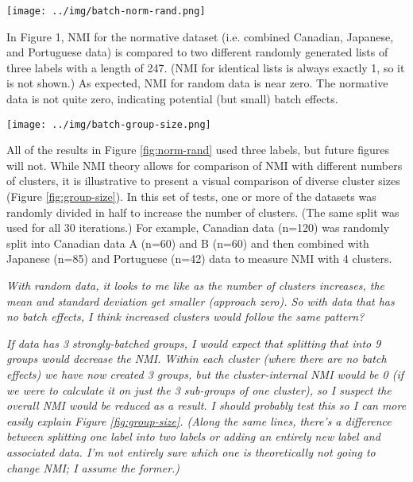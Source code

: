 \documentclass[12pt]{article}
\begin{document}
\begin{figure*}[ht]
  \centering
       \texttt{[image: ../img/batch-norm-rand.png]}
         \caption{}
  \label{fig:norm-rand}
\end{figure*}

In Figure 1, NMI for the normative dataset (i.e. combined Canadian, Japanese, and Portuguese data) is compared to two different randomly generated lists of three labels with a length of 247. (NMI for identical lists is always exactly 1, so it is not shown.) As expected, NMI for random data is near zero. The normative data is not quite zero, indicating potential (but small) batch effects.

\pagebreak

\begin{figure*}
  \centering
       \texttt{[image: ../img/batch-group-size.png]}
         \caption{}
  \label{fig:group-size}
\end{figure*}

All of the results in Figure \ref{fig:norm-rand} used three labels, but future figures will not. While NMI theory allows for comparison of NMI with different numbers of clusters, it is illustrative to present a visual comparison of diverse cluster sizes (Figure \ref{fig:group-size}). In this set of tests, one or more of the datasets was randomly divided in half to increase the number of clusters. (The same split was used for all 30 iterations.) For example, Canadian data (n=120) was randomly split into Canadian data A (n=60) and B (n=60) and then combined with Japanese (n=85) and Portuguese (n=42) data to measure NMI with 4 clusters.

\emph{With random data, it looks to me like as the number of clusters increases, the mean and standard deviation get smaller (approach zero). So with data that has no batch effects, I think increased clusters would follow the same pattern?}

\emph{If data has 3 strongly-batched groups, I would expect that splitting that into 9 groups would decrease the NMI. Within each cluster (where there are no batch effects) we have now created 3 groups, but the cluster-internal NMI would be 0 (if we were to calculate it on just the 3 sub-groups of one cluster), so I suspect the overall NMI would be reduced as a result. I should probably test this so I can more easily explain Figure \ref{fig:group-size}. (Along the same lines, there's a difference between splitting one label into two labels or adding an entirely new label and associated data. I'm not entirely sure which one is theoretically not going to change NMI; I assume the former.)}
\end{document}

